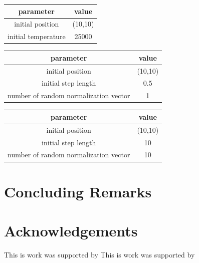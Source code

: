 \documentclass[smallextended]{svjour3}       %
\begin{document}
\begin{tabular}{cc}
	\toprule
	parameter & value \\
	\midrule
    initial position & (10,10) \\
    initial temperature  &  25000 \\
	\bottomrule
\end{tabular}

\begin{tabular}{cc}
	\toprule
	parameter & value \\
	\midrule
    initial position & (10,10) \\
    initial step length &  0.5   \\
    number of random normalization vector & 1 \\
	\bottomrule
\end{tabular}



\begin{tabular}{cc}
	\toprule
	parameter & value \\
	\midrule
    initial position & (10,10) \\
    initial step length &  10   \\
    number of random normalization vector & 10 \\
	\bottomrule
\end{tabular}





\section{Concluding Remarks}
\section{Acknowledgements}
This is work was supported by 
This is work was supported by 
\end{document}
